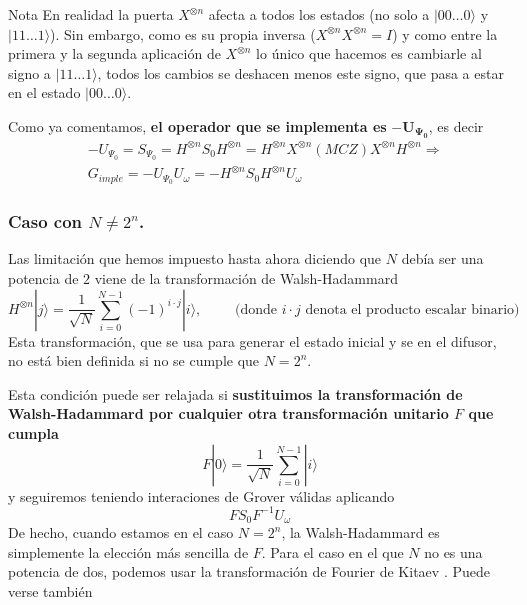 \documentclass[a4paper,11pt]{article} %
\numberwithin{equation}{section}
\begin{document}
	\begin{mybox}{Nota}
	En realidad la puerta $X^{\otimes n}$ afecta a todos los estados (no solo a $|00 \dots 0 \rangle $ y $|11 \dots 1 \rangle$).
	Sin embargo, como es su propia inversa ($X^{\otimes n}X^{\otimes n} = I$) y como entre la primera y la segunda 
	aplicación de $X^{\otimes n}$ lo único que hacemos 	es cambiarle al signo a $|11 \dots 1 \rangle$, todos los 
	cambios se deshacen menos este signo, que pasa a estar en el estado $|00 \dots 0 \rangle $. 
	\end{mybox}

Como ya comentamos,\textbf{ el operador que se implementa es} $\bm{-U_{\Psi_0}}$, es decir
\begin{align}
& \boxed{-U_{\Psi_0}  = S_{\Psi_0}  = H^{\otimes n} S_0 H^{\otimes n} = H^{\otimes n} X^{\otimes n} (MCZ) X^{\otimes n} H^{\otimes n}} \Rightarrow \label{ec_cons-imple_U_Psi0} \\ 
& \boxed{G_{imple}  =  - U_{\Psi_0} U_\omega = - H^{\otimes n} S_0 H^{\otimes n} U_\omega}
\end{align}



\subsubsection{Caso con $N \neq 2^n$.} \label{sub-sec_N-no-2^n} \label{subsec-N_neq_2n}

Las limitación que hemos impuesto hasta ahora diciendo que $N$ debía ser una potencia de $2$ viene de la transformación de Walsh-Hadammard 
\begin{equation}
H^{\otimes n} |j \rangle = \frac{1}{\sqrt{N}} \sum^{N-1}_{i=0} (-1)^{i \cdot j} | i \rangle, \qquad \text{ (donde } i \cdot j \text{ denota el producto escalar binario)}
\end{equation}
Esta transformación, que se usa para generar el estado inicial y se en el difusor, no está bien definida si no se cumple que $N=2^n$.

Esta condición puede ser relajada si\textbf{ sustituimos la transformación de Walsh-Hadammard por cualquier otra transformación unitario $F$ que cumpla}
\begin{equation} \label{ec_N-no-2n_T}
\boxed{F |0 \rangle = \frac{1}{\sqrt{N}} \sum^{N-1}_{i=0} | i \rangle}
\end{equation}
y seguiremos teniendo interaciones de Grover válidas aplicando 
\begin{equation}
F S_0 F^{-1} U_\omega
\end{equation}
De hecho, cuando estamos en el caso $N = 2^n$, la Walsh-Hadammard es simplemente la elección más sencilla de $F$. Para el caso en el que $N$ no es una potencia de dos, podemos usar la transformación de Fourier de Kitaev \cite{kitaev1995quantum}. Puede verse también \cite{PhysRevLett.80.4329} 
\end{document}
